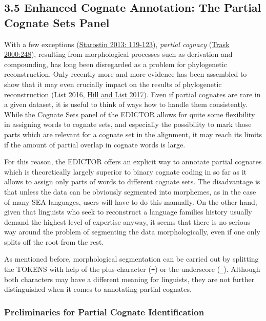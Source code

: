 \documentclass[a4paper,svgnames]{scrartcl}
\begin{document}
\subsection*{3.5 Enhanced Cognate Annotation: The Partial Cognate Sets
Panel}\label{enhanced-cognate-annotation-the-partial-cognate-sets-panel}

With a few exceptions (\href{:ref:Starostin2013}{Starostin 2013:
119-123}), \emph{partial cognacy}
(\href{http://bibliography.lingpy.org?key=Trask2000}{Trask 2000:248}),
resulting from morphological processes such as derivation and
compounding, has long been disregarded as a problem for phylogenetic
reconstruction. Only recently more and more evidence has been assembled
to show that it may even crucially impact on the results of phylogenetic
reconstruction (List 2016,
\href{http://bibliography.lingpy.org?key=Hill2017a}{Hill and List
2017}). Even if partial cognates are rare in a given dataset, it is
useful to think of ways how to handle them consistently. While the
Cognate Sets panel of the EDICTOR allows for quite some flexibility in
assigning words to cognate sets, and especially the possibility to mark
those parts which are relevant for a cognate set in the alignment, it
may reach its limits if the amount of partial overlap in cognate words
is large.

For this reason, the EDICTOR offers an explicit way to annotate partial
cognates which is theoretically largely superior to binary cognate
coding in so far as it allows to assign only parts of words to different
cognate sets. The disadvantage is that unless the data can be obviously
segmented into morphemes, as in the case of many SEA languages, users
will have to do this manually. On the other hand, given that linguists
who seek to reconstruct a language families history usually demand the
highest level of expertise anyway, it seems that there is no serious way
around the problem of segmenting the data morphologically, even if one
only splits off the root from the rest.

As mentioned before, morphological segmentation can be carried out by
splitting the TOKENS with help of the plus-character (\texttt{+}) or the
underscore (\texttt{\_}). Although both characters may have a different
meaning for linguists, they are not further distinguished when it comes
to annotating partial cognates.

\subsubsection*{Preliminaries for Partial Cognate
Identification}\label{preliminaries-for-partial-cognate-identification}
\end{document}
